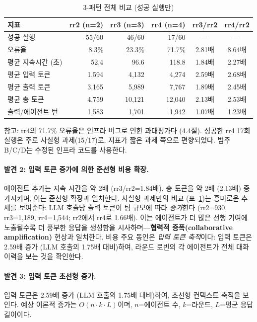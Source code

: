 \documentclass[a4paper,11pt]{article}
\begin{document}
\begin{table}[H]
\centering
\caption{3-패턴 전체 비교 (성공 실행만)}
\label{tab:cat-a-three}
{\small
\begin{tabular}{lrrrcc}
\toprule
지표 & rr2 (n=2) & rr3 (n=3) & rr4 (n=4) & rr3/rr2 & rr4/rr2 \\
\midrule
성공 실행       & 55/60 & 46/60 & 17/60 & --- & --- \\
오류율           & 8.3\% & 23.3\% & 71.7\% & 2.81배 & 8.64배 \\
평균 지속시간 (초) & 52.4 & 96.6 & 118.8 & 1.84배 & 2.27배 \\
평균 입력 토큰   & 1,594 & 4,132 & 4,274 & 2.59배 & 2.68배 \\
평균 출력 토큰   & 3,165 & 5,989 & 7,767 & 1.89배 & 2.45배 \\
평균 총 토큰     & 4,759 & 10,121 & 12,040 & 2.13배 & 2.53배 \\
출력/에이전트 턴 & 1,583 & 1,701 & 1,942 & 1.07배 & 1.23배 \\
\bottomrule
\end{tabular}
}
\end{table}

참고: rr4의 71.7\% 오류율은 인프라 버그로 인한 과대평가다 (4.4절). 성공한 rr4 17회 실행은 주로 사실형 과제(15/17)로, 지표가 짧은 과제 쪽으로 편향되었다. 범주 B/C/D는 수정된 인프라 코드를 사용한다.

\paragraph{발견 2: 입력 토큰 증가에 의한 준선형 비용 확장.}
에이전트 추가는 지속 시간을 약 2배 (rr3/rr2=1.84배), 총 토큰을 약 2배 (2.13배) 증가시키며, 이는 준선형 확장과 일치한다. 사실형 과제만의 비교 (표~\ref{tab:cat-a-three})는 흥미로운 추세를 보여준다: LLM 호출당 출력 토큰이 팀 규모에 따라 \emph{증가}한다 (rr2=930, rr3=1,189, rr4=1,544; rr2에서 rr4로 1.66배). 이는 에이전트가 더 많은 선행 기여에 노출될수록 더 풍부한 응답을 생성함을 시사하며---\textbf{협력적 증폭(collaborative amplification)} 현상과 일치한다. 비용 주요 동인은 \emph{입력 토큰 축적}이다: 입력 토큰은 2.59배 증가 (LLM 호출의 1.75배 대비)하여, 라운드 로빈의 각 에이전트가 전체 대화 이력을 보는 것을 확인한다.

\paragraph{발견 3: 입력 토큰 초선형 증가.}
입력 토큰은 2.59배 증가 (LLM 호출의 1.75배 대비)하여, 초선형 컨텍스트 축적을 보인다. 예상 이론적 증가는 $O(n \cdot k \cdot L)$이며, $n$=에이전트 수, $k$=라운드, $L$=평균 응답 길이이다.
\end{document}
